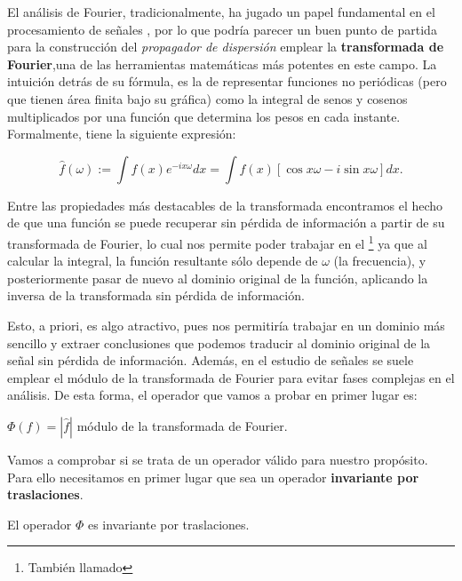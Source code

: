 \noindent El análisis de Fourier, tradicionalmente, ha jugado un papel fundamental en el procesamiento de señales \cite{DigitalImageProcessing}, por lo que podría parecer un buen punto de partida para la construcción del \textit{propagador de dispersión} emplear la \textbf{transformada de Fourier},una de las herramientas matemáticas más potentes en este campo. La intuición detrás de su fórmula, es la de representar funciones no periódicas (pero que tienen área finita bajo su gráfica) como la integral de senos y cosenos multiplicados por una función que determina los pesos en cada instante. Formalmente, tiene la siguiente expresión:

\begin{equation}
\widehat{f}(\omega):= \int{f(x)e^{-ix\omega}dx}=\int{f(x)\left[\cos{x\omega} -i\sin{x\omega}\right]dx}.
\end{equation}

\noindent Entre las propiedades más destacables de la transformada encontramos el hecho de que una función se puede recuperar sin pérdida de información a partir de su transformada de Fourier, lo cual nos permite poder trabajar en el \footnote{También llamado } ya que al calcular la integral, la función resultante sólo depende de $\omega$ (la frecuencia), y posteriormente pasar de nuevo al dominio original de la función, aplicando la inversa de la transformada sin pérdida de información.

\medskip

\noindent Esto, a priori, es algo atractivo, pues nos permitiría trabajar en un dominio más sencillo y extraer conclusiones que podemos traducir al dominio original de la señal sin pérdida de información. Además, en el estudio de señales se suele emplear el módulo de la transformada de Fourier para evitar fases complejas en el análisis. De esta forma, el operador que vamos a probar en primer lugar es: 

\begin{definicion}
$\Phi(f)=|\widehat{f}|$ módulo de la transformada de Fourier. 
\end{definicion}

\noindent Vamos a comprobar si se trata de un operador válido para nuestro propósito. Para ello necesitamos en primer lugar que sea un operador \textbf{invariante por traslaciones}.

\begin{lema} \label{lema::invarianza_traslaciones}
    El operador $\Phi$ es invariante por traslaciones.
\end{lema}

